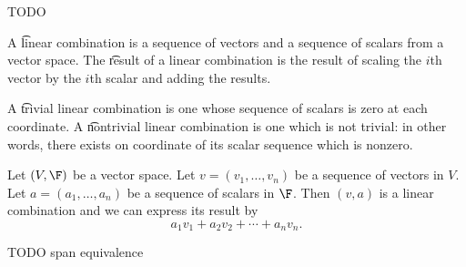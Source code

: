 
\sbasic





























\sstart
{}


TODO


A \t{linear combination} is a sequence of vectors and a sequence of scalars from a vector space.
The \t{result of a linear combination} is the result of scaling the $i$th vector by the $i$th scalar and adding the results.

A \t{trivial linear combination} is one whose sequence of scalars is zero at each coordinate.
A \t{nontrivial linear combination} is one which is not trivial: in other words, there exists on coordinate of its scalar sequence which is nonzero.


Let $(V, \F)$ be a vector space.
Let $v = (v_1, \dots, v_n)$ be a sequence of vectors in $V$.
Let $a = (a_1, \dots, a_n)$ be a sequence of scalars in $\F$.
Then $(v, a)$ is a linear combination and we can express its result by
$$
  a_1v_1 + a_2v_2 + \cdots + a_n v_n.
$$


TODO span equivalence
\strats
